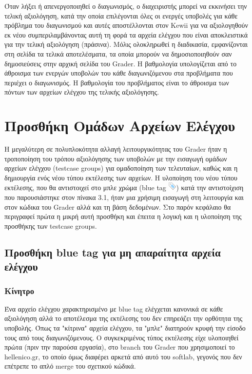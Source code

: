 \documentclass[diploma]{softlab-thesis}
\begin{document}
\bigskip

Όταν λήξει ή απενεργοποιηθεί ο διαγωνισμός, ο διαχειριστής μπορεί να εκκινήσει
την τελική αξιολόγηση, κατά την οποία επιλέγονται όλες οι ενεργές υποβολές για
κάθε πρόβλημα του διαγωνισμού και αυτές αποστέλλονται στον Kewii για να
αξιολογηθούν εκ νέου συμπεριλαμβάνοντας αυτή τη φορά τα αρχεία ελέγχου που
είναι αποκλειστικά για την τελική αξιολόγηση (πράσινα). Μόλις ολοκληρωθεί η
διαδικασία, εμφανίζονται στη σελίδα τα τελικά αποτελέσματα, τα οποία μπορούν να
δημοσιοποιηθούν σαν δημοσιεύσεις στην αρχική σελίδα του Grader. Η βαθμολογία
υπολογίζεται από το άθροισμα των ενεργών υποβολών του κάθε διαγωνιζόμενου στα
προβλήματα που περιέχει ο διαγωνισμός. Η βαθμολογία του προβλήματος είναι το
άθροισμα των πόντων των αρχείων ελέγχου της τελικής αξιολόγησης.


\chapter{Προσθήκη Ομάδων Αρχείων Ελέγχου}

Η μεγαλύτερη σε πολυπλοκότητα αλλαγή λειτουργικότητας του Grader ήταν η
τροποποίηση του τρόπου αξιολόγησης των υποβολών με την εισαγωγή ομάδων αρχείων
ελέγχου (testcase groups) για ομαδοποίηση των τελευταίων, καθώς και η
δημιουργία ενός νέου τύπου εκτέλεσης των αρχείων. Η υλοποίηση του νέου τύπου
εκτέλεσης, που θα αντιστοιχεί στο μπλε χρώμα (blue tag
\includegraphics[scale=0.8]{Figures/tag_blue.png}) κατά την αντιστοίχιση που
παρουσιάστηκε στον πίνακα 3.1, ήταν μια χρήσιμη εισαγωγή στη λειτουργία και
στον κώδικα του Grader αλλά και τη βάση δεδομένων. Στο παρόν κεφάλαιο θα
περιγραφεί πρώτα η μικρή αυτή προσθήκη και έπειτα η λογική και η υλοποίηση της
προσθήκης των testcase groups.

\section{Προσθήκη blue tag για μη απαραίτητα αρχεία ελέγχου}

\subsection{Κίνητρο}

Ένα αρχείο ελέγχου χαρακτηρισμένο με blue tag ελέγχεται κανονικά σε κάθε
αξιολόγηση αλλά το αποτέλεσμα της εκτέλεσης του δεν επηρεάζει την ορθότητα της
υποβολής. Όπως τα "κίτρινα" αρχεία ελέγχου, τα "μπλε" διατηρούν κρυφή την είσοδο
τους από τους διαγωνιζόμενους. Ο συγκεκριμένος τύπος εκτέλεσης είχε
υλοποιηθεί πρώτα (πριν την παρούσα εργασία), στο branch του Grader που
χρησιμοποιεί το hellenico.gr, το οποίο όμως διαφέρει αρκετά από αυτό του softlab,
γεγονός που δεν επέτρεπε το απλό merge του σχετικού κώδικά.
\end{document}
